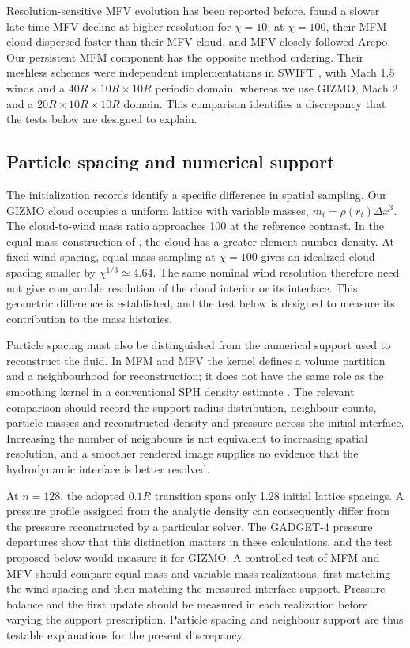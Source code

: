 \documentclass[twocolumn,apj,numberedappendix]{openjournal}
\begin{document}
Resolution-sensitive MFV evolution has been reported before. \citet{Braspenning2023} found a slower late-time MFV decline at higher resolution for $\chi=10$; at $\chi=100$, their MFM cloud dispersed faster than their MFV cloud, and MFV closely followed Arepo. Our persistent MFM component has the opposite method ordering. Their meshless schemes were independent implementations in SWIFT \citep{Schaller2024}, with Mach 1.5 winds and a $40R\times10R\times10R$ periodic domain, whereas we use GIZMO, Mach 2 and a $20R\times10R\times10R$ domain. This comparison identifies a discrepancy that the tests below are designed to explain.

\subsection{Particle spacing and numerical support}
The initialization records identify a specific difference in spatial sampling. Our GIZMO cloud occupies a uniform lattice with variable masses, $m_i=\rho(r_i)\Delta x^3$. The cloud-to-wind mass ratio approaches 100 at the reference contrast. In the equal-mass construction of \citet{Braspenning2023}, the cloud has a greater element number density. At fixed wind spacing, equal-mass sampling at $\chi=100$ gives an idealized cloud spacing smaller by $\chi^{1/3}\simeq4.64$. The same nominal wind resolution therefore need not give comparable resolution of the cloud interior or its interface. This geometric difference is established, and the test below is designed to measure its contribution to the mass histories.

Particle spacing must also be distinguished from the numerical support used to reconstruct the fluid. In MFM and MFV the kernel defines a volume partition and a neighbourhood for reconstruction; it does not have the same role as the smoothing kernel in a conventional SPH density estimate \citep{Hopkins2015}. The relevant comparison should record the support-radius distribution, neighbour counts, particle masses and reconstructed density and pressure across the initial interface. Increasing the number of neighbours is not equivalent to increasing spatial resolution, and a smoother rendered image supplies no evidence that the hydrodynamic interface is better resolved.

At $n=128$, the adopted $0.1R$ transition spans only 1.28 initial lattice spacings. A pressure profile assigned from the analytic density can consequently differ from the pressure reconstructed by a particular solver. The GADGET-4 pressure departures show that this distinction matters in these calculations, and the test proposed below would measure it for GIZMO. A controlled test of MFM and MFV should compare equal-mass and variable-mass realizations, first matching the wind spacing and then matching the measured interface support. Pressure balance and the first update should be measured in each realization before varying the support prescription. Particle spacing and neighbour support are thus testable explanations for the present discrepancy.
\end{document}
